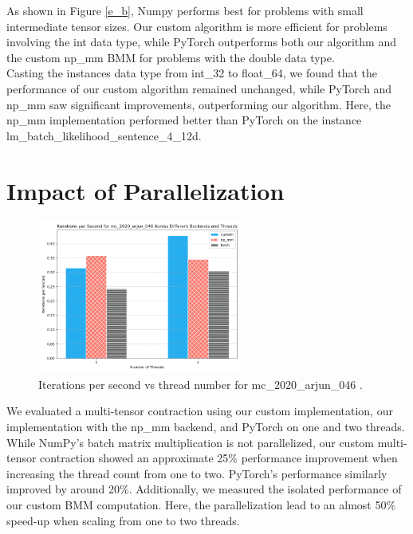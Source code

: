 \noindent As shown in Figure \ref{e_b}, Numpy performs best for problems with small intermediate tensor sizes. Our custom algorithm is more efficient for problems involving the int data type, while PyTorch outperforms both our algorithm and the custom np\_mm BMM for problems with the double data type.\\
Casting the instances data type from int\_32 to float\_64, we found that the performance of our custom algorithm remained unchanged, while PyTorch and np\_mm saw significant improvements, outperforming our algorithm. Here, the np\_mm implementation performed better than PyTorch on the instance lm\_batch\_likelihood\_sentence\_4\_12d.


\section{Impact of Parallelization}
\begin{figure}[H]
    \centering
    \includegraphics[width=0.6\textwidth]{images/threads.png}  %
    \caption{Iterations per second vs thread number for mc\_2020\_arjun\_046 \cite{blacher2024einsum}.}
    \label{threads}
\end{figure}
\noindent We evaluated a multi-tensor contraction using our custom implementation, our implementation with the np\_mm backend, and PyTorch on one and two threads. While NumPy’s batch matrix multiplication is not parallelized, our custom multi-tensor contraction showed an approximate 25\% performance improvement when increasing the thread count from one to two. PyTorch’s performance similarly improved by around 20\%. Additionally, we measured the isolated performance of our custom BMM computation. Here, the parallelization lead to an almost 50\% speed-up when scaling from one to two threads. 
